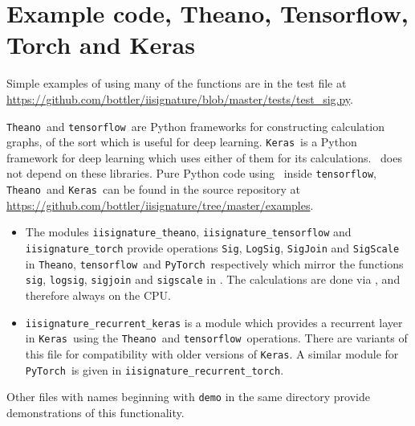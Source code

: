 \documentclass[a4paper]{extarticle}
\begin{document}
\section{Example code, Theano, Tensorflow, Torch and Keras}
\def\Th{\texttt{Theano}}
\def\Te{\texttt{tensorflow}}
\def\K{\texttt{Keras}}
Simple examples of using many of the functions are in the test file at \url{https://github.com/bottler/iisignature/blob/master/tests/test_sig.py}.

\Th\ and \Te\ are Python frameworks for constructing calculation graphs, of the sort which is useful for deep learning. \K\ is a Python framework for deep learning which uses either of them for its calculations. \ii\ does not depend on these libraries. Pure Python code using \ii\ inside \Te, \Th\ and \K\ can be found in the source repository at \url{https://github.com/bottler/iisignature/tree/master/examples}.

\begin{itemize}
\def\pytorch{\texttt{PyTorch}}
\item The modules \verb!iisignature_theano!, \verb!iisignature_tensorflow! and \verb|iisignature_torch| provide operations \verb!Sig!, \verb|LogSig|, \verb|SigJoin| and \verb!SigScale! in \Th, \Te\ and \pytorch\ respectively which mirror the functions \verb!sig!, \verb|logsig|, \verb!sigjoin! and \verb!sigscale! in \ii. The calculations are done via \ii, and therefore always on the CPU. 
\item \verb!iisignature_recurrent_keras! is a module which provides a recurrent layer in \K\ using the \Th\ and \Te\ operations. There are variants of this file for compatibility with older versions of \K. A similar module for \pytorch\ is given in \verb!iisignature_recurrent_torch!.
\end{itemize}
Other files with names beginning with \verb|demo| in the same directory provide demonstrations of this functionality.
\end{document}
